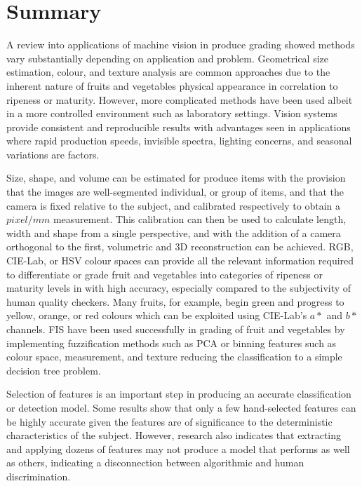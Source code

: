 \documentclass[fleqn,twoside,12pt]{report}
\begin{document}
\section{Summary}


A review into applications of machine vision in produce grading showed methods vary substantially depending on application and problem. Geometrical size estimation, colour, and texture analysis are common approaches due to the inherent nature of fruits and vegetables physical appearance in correlation to ripeness or maturity. However, more complicated methods have been used albeit in a more controlled environment such as laboratory settings. Vision systems provide consistent and reproducible results with advantages seen in applications where rapid production speeds, invisible spectra, lighting concerns, and seasonal variations are factors.

Size, shape, and volume can be estimated for produce items with the provision that the images are well-segmented individual, or group of items, and that the camera is fixed relative to the subject, and calibrated respectively to obtain a $pixel/mm$ measurement. This calibration can then be used to calculate length, width and shape from a single perspective, and with the addition of a camera orthogonal to the first, volumetric and 3D reconstruction can be achieved. RGB, CIE-Lab, or HSV colour spaces can provide all the relevant information required to differentiate or grade fruit and vegetables into categories of ripeness or maturity levels in with high accuracy, especially compared to the subjectivity of human quality checkers. Many fruits, for example, begin green and progress to yellow, orange, or red colours which can be exploited using CIE-Lab's $a*$ and $b*$ channels. FIS have been used successfully in grading of fruit and vegetables by implementing fuzzification methods such as PCA or binning features such as colour space, measurement, and texture reducing the classification to a simple decision tree problem.  

Selection of features is an important step in producing an accurate classification or detection model. Some results show that only a few hand-selected features can be highly accurate given the features are of significance to the deterministic characteristics of the subject. However, research also indicates that extracting and applying dozens of features may not produce a model that performs as well as others, indicating a disconnection between algorithmic and human discrimination.
\end{document}
